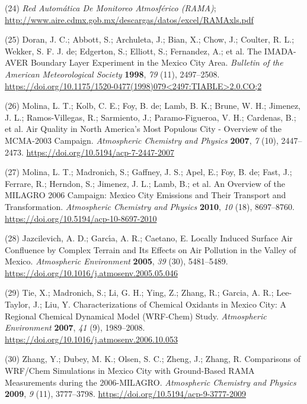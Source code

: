 \documentclass[10pt]{article}
\begin{document}
\label{csl:24}(24) \textit{{Red Automática De Monitoreo Atmosférico (RAMA)}}; \url{http://www.aire.cdmx.gob.mx/descargas/datos/excel/RAMAxls.pdf}

\label{csl:25}(25) Doran, J. C.; Abbott, S.; Archuleta, J.; Bian, X.; Chow, J.; Coulter, R. L.; Wekker, S. F. J. de; Edgerton, S.; Elliott, S.; Fernandez, A.; et al. {The IMADA-AVER Boundary Layer Experiment in the Mexico City Area}. \textit{Bulletin of the American Meteorological Society} \textbf{1998}, \textit{79} (11), 2497–2508. \url{https://doi.org/10.1175/1520-0477(1998)079<2497:TIABLE>2.0.CO;2}

\label{csl:26}(26) Molina, L. T.; Kolb, C. E.; Foy, B. de; Lamb, B. K.; Brune, W. H.; Jimenez, J. L.; Ramos-Villegas, R.; Sarmiento, J.; Paramo-Figueroa, V. H.; Cardenas, B.; et al. {Air Quality in North America's Most Populous City - Overview of the {MCMA}-2003 Campaign}. \textit{Atmospheric Chemistry and Physics} \textbf{2007}, \textit{7} (10), 2447–2473. \url{https://doi.org/10.5194/acp-7-2447-2007}

\label{csl:27}(27) Molina, L. T.; Madronich, S.; Gaffney, J. S.; Apel, E.; Foy, B. de; Fast, J.; Ferrare, R.; Herndon, S.; Jimenez, J. L.; Lamb, B.; et al. {An Overview of the {MILAGRO} 2006 Campaign: Mexico City Emissions and Their Transport and Transformation}. \textit{Atmospheric Chemistry and Physics} \textbf{2010}, \textit{10} (18), 8697–8760. \url{https://doi.org/10.5194/acp-10-8697-2010}

\label{csl:28}(28) Jazcilevich, A. D.; Garc{\'{\i}}a, A. R.; Caetano, E. {Locally Induced Surface Air Confluence by Complex Terrain and Its Effects on Air Pollution in the Valley of Mexico}. \textit{Atmospheric Environment} \textbf{2005}, \textit{39} (30), 5481–5489. \url{https://doi.org/10.1016/j.atmosenv.2005.05.046}

\label{csl:29}(29) Tie, X.; Madronich, S.; Li, G. H.; Ying, Z.; Zhang, R.; Garcia, A. R.; Lee-Taylor, J.; Liu, Y. {Characterizations of Chemical Oxidants in Mexico City: A Regional Chemical Dynamical Model ({WRF}-Chem) Study}. \textit{Atmospheric Environment} \textbf{2007}, \textit{41} (9), 1989–2008. \url{https://doi.org/10.1016/j.atmosenv.2006.10.053}

\label{csl:30}(30) Zhang, Y.; Dubey, M. K.; Olsen, S. C.; Zheng, J.; Zhang, R. {Comparisons of {WRF}/Chem Simulations in Mexico City with Ground-Based {RAMA} Measurements during the 2006-{MILAGRO}}. \textit{Atmospheric Chemistry and Physics} \textbf{2009}, \textit{9} (11), 3777–3798. \url{https://doi.org/10.5194/acp-9-3777-2009}
\end{document}
